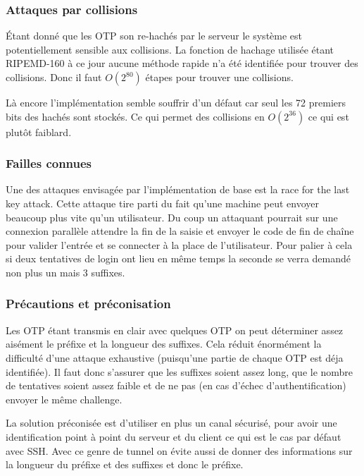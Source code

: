 \documentclass{../res/univ-projet}
\begin{document}
\subsubsection{Attaques par collisions}
        Étant donné que les OTP son re-hachés par le serveur le système est potentiellement sensible
    aux collisions. La fonction de hachage utilisée étant RIPEMD-160 à ce jour aucune méthode rapide
    n'a été identifiée pour trouver des collisions. Donc il faut $O(2^80)$ étapes pour trouver une 
    collisions.
    
        Là encore l'implémentation semble souffrir d'un défaut car seul les 72 premiers bits des hachés
    sont stockés. Ce qui permet des collisions en $O(2^36)$ ce qui est plutôt faiblard.

\subsubsection{Failles connues} 
        Une des attaques envisagée par l'implémentation de base est la race for the last key attack.
    Cette attaque tire parti du fait qu'une machine peut envoyer beaucoup plus vite qu'un utilisateur.
    Du coup un attaquant pourrait sur une connexion parallèle attendre la fin de la saisie et envoyer
    le code de fin de chaîne pour valider l'entrée et se connecter à la place de l'utilisateur.
    Pour palier à cela si deux tentatives de login ont lieu en même temps la seconde se verra demandé
    non plus un mais 3 suffixes.

\subsubsection{Précautions et préconisation}
        Les OTP étant transmis en clair avec quelques OTP on peut déterminer assez
    aisément le préfixe et la longueur des suffixes. Cela réduit énormément la
    difficulté d'une attaque exhaustive (puisqu'une partie de chaque OTP est déja identifiée).
    Il faut donc s'assurer que les suffixes soient assez long, que le nombre de tentatives 
    soient assez faible et de ne pas (en cas d'échec d'authentification) envoyer le même challenge.


        La solution préconisée est d'utiliser en plus un canal sécurisé, pour avoir une 
    identification point à point du serveur et du client ce qui est le cas par défaut avec
    SSH. Avec ce genre de tunnel on évite aussi de donner des informations sur la longueur du préfixe
    et des suffixes et donc le préfixe. %
\end{document}
